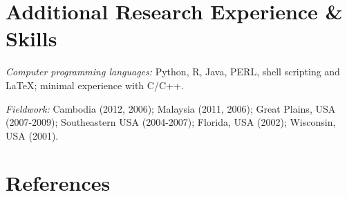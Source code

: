 \documentclass[10pt]{article}
\newcommand{\myHangIndent}{\hangindent=5mm}
\begin{document}
\section*{Additional Research Experience \& Skills}
\myHangIndent
{\sffamily\itshape Computer programming languages:} Python, R, Java, PERL,
shell scripting and \LaTeX; minimal experience with C/C++.

\myHangIndent
{\sffamily\itshape Fieldwork:} Cambodia (2012, 2006); Malaysia (2011, 2006);
Great Plains, USA (2007-2009); Southeastern USA (2004-2007); Florida, USA
(2002); Wisconsin, USA (2001).

\section*{References}

\end{document}
